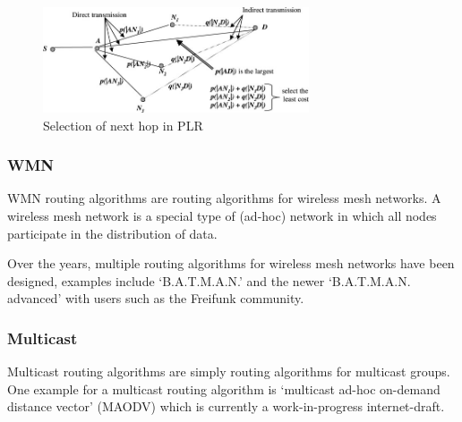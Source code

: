 \begin{figure}
\centering
\includegraphics[width=0.7\textwidth]{images/plr-example}
\caption{Selection of next hop in PLR\cite{alotaibi2012survey}}
\label{plrexample}
\end{figure}

\subsubsection*{WMN}
WMN routing algorithms are routing algorithms for wireless mesh networks.
A wireless mesh network is a special type of (ad-hoc) network in which all
nodes participate in the distribution of data.

Over the years, multiple routing algorithms for wireless mesh networks have
been designed, examples include `B.A.T.M.A.N.' and the newer `B.A.T.M.A.N. advanced'
with users such as the Freifunk community\cite{batman-adv}.

\subsubsection*{Multicast}
Multicast routing algorithms are simply routing algorithms for multicast
groups.
One example for a multicast routing algorithm is `multicast ad-hoc on-demand
distance vector' (MAODV)\cite{manet-maodv-00} which is currently a
work-in-progress internet-draft.
